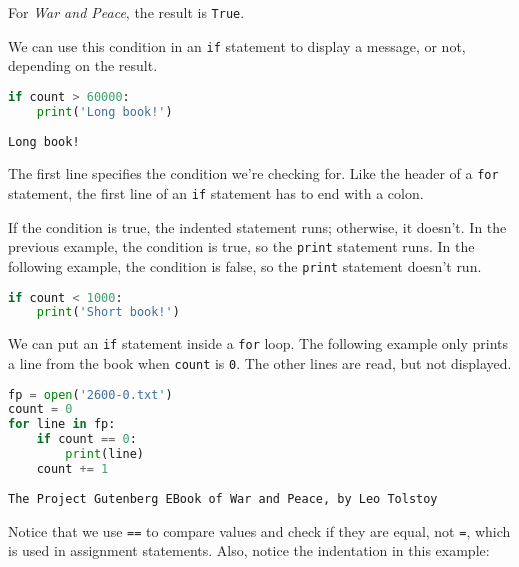 For \emph{War and Peace}, the result is \passthrough{\lstinline!True!}.

\pagebreak

We can use this condition in an \passthrough{\lstinline!if!} statement
to display a message, or not, depending on the result.

\begin{lstlisting}[language=Python,style=source]
if count > 60000:
    print('Long book!')
\end{lstlisting}

\begin{lstlisting}[style=output]
Long book!
\end{lstlisting}

The first line specifies the condition we're checking for. Like the
header of a \passthrough{\lstinline!for!} statement, the first line of
an \passthrough{\lstinline!if!} statement has to end with a colon.

If the condition is true, the indented statement runs; otherwise, it
doesn't. In the previous example, the condition is true, so the
\passthrough{\lstinline!print!} statement runs. In the following
example, the condition is false, so the \passthrough{\lstinline!print!}
statement doesn't run.

\begin{lstlisting}[language=Python,style=source]
if count < 1000:
    print('Short book!')
\end{lstlisting}

We can put an \passthrough{\lstinline!if!} statement inside a
\passthrough{\lstinline!for!} loop. The following example only prints a
line from the book when \passthrough{\lstinline!count!} is
\passthrough{\lstinline!0!}. The other lines are read, but not
displayed.

\begin{lstlisting}[language=Python,style=source]
fp = open('2600-0.txt')
count = 0
for line in fp:
    if count == 0:
        print(line)
    count += 1
\end{lstlisting}

\begin{lstlisting}[style=output]
The Project Gutenberg EBook of War and Peace, by Leo Tolstoy
\end{lstlisting}

Notice that we use \passthrough{\lstinline!==!} to compare values and
check if they are equal, not \passthrough{\lstinline!=!}, which is used
in assignment statements. Also, notice the indentation in this example:

